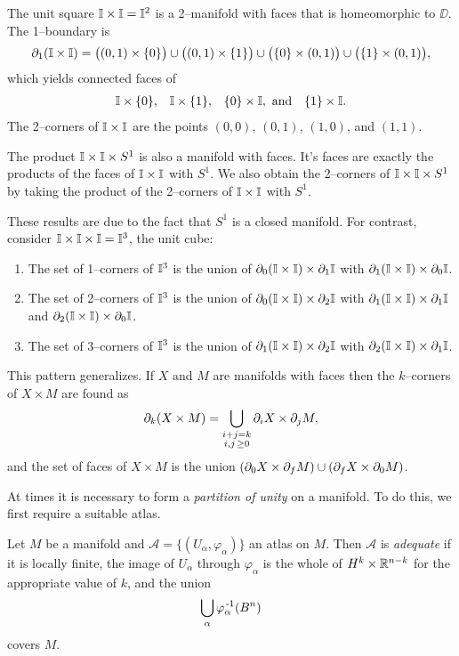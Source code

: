 \begin{ex}
	The unit square $\mathbb{I}\times \mathbb{I}=\mathbb{I}^2$ is a 2--manifold with faces that is homeomorphic to $\DD$.
	The 1--boundary is 
	\[\partial_1(\mathbb{I}\times\mathbb{I}) = \big((0,1)\times\{0\}\big)\cup\big((0,1)\times\{1\}\big)\cup\big(\{0\}\times(0,1)\big)\cup\big(\{1\}\times(0,1)\big),\]
	which yields connected faces of
	\[
		\begin{array}{cccc}
			\mathbb{I}\times\{0\}, & \mathbb{I}\times\{1\}, & \{0\}\times\mathbb{I}, \textmd{ and}&\{1\}\times\mathbb{I}.
		\end{array}
	\]
	The 2--corners of $\mathbb{I}\times\mathbb{I}$ are the points $(0,0)$, $(0,1)$, $(1,0)$, and $(1,1)$.

	The product $\mathbb{I}\times\mathbb{I}\times S^1$ is also a manifold with faces.
	It's faces are exactly the products of the faces of $\mathbb{I}\times\mathbb{I}$ with $S^1$.
	We also obtain the 2--corners of $\mathbb{I}\times\mathbb{I}\times S^1$ by taking the product of the 2--corners of $\mathbb{I}\times\mathbb{I}$ with $S^1$.
	
	These results are due to the fact that $S^1$ is a closed manifold.
	For contrast, consider $\mathbb{I}\times\mathbb{I}\times\mathbb{I}=\mathbb{I}^3$, the unit cube:
	\begin{enumerate}
		\item The set of 1--corners of $\mathbb{I}^3$ is the union of $\partial_0(\mathbb{I}\times\mathbb{I})\times\partial_1\mathbb{I}$ with $\partial_1(\mathbb{I}\times\mathbb{I})\times\partial_0\mathbb{I}$.
		\item The set of 2--corners of $\mathbb{I}^3$ is the union of $\partial_0(\mathbb{I}\times\mathbb{I})\times\partial_2\mathbb{I}$ with $\partial_1(\mathbb{I}\times\mathbb{I})\times\partial_1\mathbb{I}$ and $\partial_2(\mathbb{I}\times\mathbb{I})\times\partial_0\mathbb{I}$.
		\item The set of 3--corners of $\mathbb{I}^3$ is the union of $\partial_1(\mathbb{I}\times\mathbb{I})\times\partial_2\mathbb{I}$ with $\partial_2(\mathbb{I}\times\mathbb{I})\times\partial_1\mathbb{I}$.
	\end{enumerate}	
	This pattern generalizes.
	If $X$ and $M$ are manifolds with faces then the $k$--corners of $X\times M$ are found as
	\[
		\partial_k(X\times M) = \bigcup_{\substack{i+j=k\\i,j\,\geq0}} \partial_i X\times \partial_j M,
	\]
	and the set of faces of $X\times M$ is the union $(\partial_0 X\times\partial_f M)\cup(\partial_f X\times\partial_0 M)$.
\end{ex}

At times it is necessary to form a \emph{partition of unity} on a manifold.
To do this, we first require a suitable atlas.

\begin{defn}
	\label{def:adequate}
	Let $M$ be a manifold and $\mathcal{A}=\{(U_\alpha,\varphi_\alpha)\}$ an atlas on $M$.
	Then $\mathcal{A}$ is \emph{adequate} if it is locally finite, the image of $U_\alpha$ through $\varphi_\alpha$ is the whole of $H^k\times\mathbb{R}^{n-k}$ for the appropriate value of $k$, and the union 
	\[
		\bigcup_\alpha \varphi_\alpha^{\,\text{-}1}(B^n)
	\]
	covers $M$.
\end{defn}


